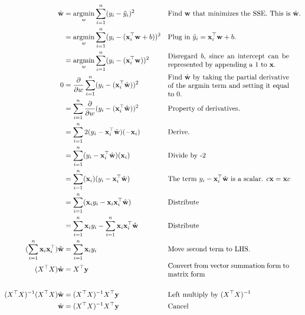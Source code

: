\begin{flushleft}
    \begin{align*}
        \hat{\textbf{w}} &= \argmin_w \sum_{i=1}^n (y_i - \hat{y}_i)^2 && \text{Find $\textbf{w}$ that minimizes the SSE. This is $\hat{\textbf{w}}$.}\\
        &= \argmin_w \sum_{i=1}^n (y_i - (\textbf{x}_i^{\top}\textbf{w} + b))^2 && \text{Plug in $\hat{y}_i = \textbf{x}_i^{\top}\textbf{w} + b$.}\\
        &= \argmin_w \sum_{i=1}^n (y_i - (\textbf{x}_i^{\top}\textbf{w}))^2 && \text{\parbox{0.5\textwidth}{Disregard $b$, since an intercept can be represented by appending a 1 to $\textbf{x}$.}}\\
        0 &= \frac{\partial}{\partial w} \sum_{i=1}^n (y_i - (\textbf{x}_i^{\top}\hat{\textbf{w}}))^2 && \text{\parbox{0.5\textwidth}{Find $\hat{\textbf{w}}$ by taking the partial derivative of the argmin term and setting it equal to 0.}}\\
        &= \sum_{i=1}^n \frac{\partial}{\partial w} (y_i - (\textbf{x}_i^{\top}\hat{\textbf{w}}))^2 && \text{Property of derivatives.}\\
        &= \sum_{i=1}^n 2(y_i - \textbf{x}_i^{\top}\hat{\textbf{w}})(-\textbf{x}_i) && \text{Derive.}\\
        &= \sum_{i=1}^n (y_i - \textbf{x}_i^{\top}\hat{\textbf{w}})(
        \textbf{x}_i) && \text{Divide by -2}\\
        &= \sum_{i=1}^n (
        \textbf{x}_i)(y_i - \textbf{x}_i^{\top}\hat{\textbf{w}}) && \text{The term $y_i - \textbf{x}_i^{\top}\hat{\textbf{w}}$ is a scalar. $c\textbf{x} = \textbf{x}c$}\\
        &= \sum_{i=1}^n (\textbf{x}_iy_i - \textbf{x}_i\textbf{x}_i^{\top}\hat{\textbf{w}}) && \text{Distribute}\\
        &= \sum_{i=1}^n \textbf{x}_iy_i - \sum_{i=1}^n \textbf{x}_i\textbf{x}_i^{\top}\hat{\textbf{w}} && \text{Distribute}\\
        (\sum_{i=1}^n \textbf{x}_i\textbf{x}_i^{\top})\hat{\textbf{w}} &= \sum_{i=1}^n \textbf{x}_iy_i && \text{Move second term to LHS.}\\
        (X^{\top}X)\hat{\textbf{w}} &= X^{\top}\textbf{y} && \text{\parbox{0.5\textwidth}{Convert from vector summation form to matrix form}}\\\\
        (X^{\top}X)^{-1}(X^{\top}X)\hat{\textbf{w}} &= (X^{\top}X)^{-1}X^{\top}\textbf{y} && \text{Left multiply by $(X^{\top}X)^{-1}$}\\
        \hat{\textbf{w}} &= (X^{\top}X)^{-1}X^{\top}\textbf{y} && \text{Cancel}\\
    \end{align*}


\end{flushleft}
